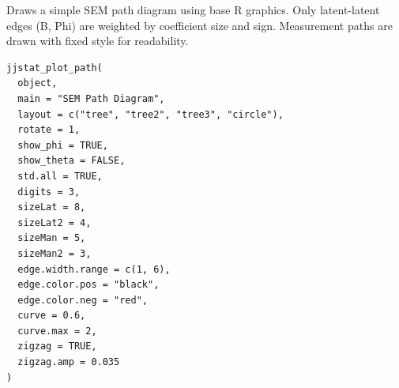 \documentclass[a4paper]{book}
\begin{document}
%
\begin{Description}
Draws a simple SEM path diagram using base R graphics.
Only latent-latent edges (B, Phi) are weighted by coefficient size and sign.
Measurement paths are drawn with fixed style for readability.
\end{Description}
%
\begin{Usage}
\begin{verbatim}
jjstat_plot_path(
  object,
  main = "SEM Path Diagram",
  layout = c("tree", "tree2", "tree3", "circle"),
  rotate = 1,
  show_phi = TRUE,
  show_theta = FALSE,
  std.all = TRUE,
  digits = 3,
  sizeLat = 8,
  sizeLat2 = 4,
  sizeMan = 5,
  sizeMan2 = 3,
  edge.width.range = c(1, 6),
  edge.color.pos = "black",
  edge.color.neg = "red",
  curve = 0.6,
  curve.max = 2,
  zigzag = TRUE,
  zigzag.amp = 0.035
)
\end{verbatim}
\end{Usage}
%
\end{document}
